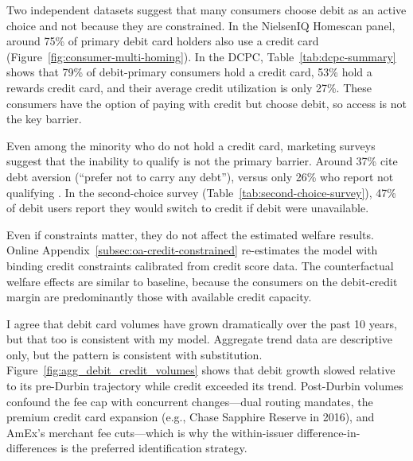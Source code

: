 \documentclass[main.tex]{subfiles}
\begin{document}
\begin{refsection}
Two independent datasets suggest that many consumers choose debit as an active choice and not because they are constrained.
In the NielsenIQ Homescan panel, around 75\% of primary debit card holders also use a credit card (Figure~\ref{fig:consumer-multi-homing}).
In the DCPC, Table~\ref{tab:dcpc-summary} shows that 79\% of debit-primary consumers hold a credit card, 53\% hold a rewards credit card, and their average credit utilization is only 27\%.
These consumers have the option of paying with credit but choose debit, so access is not the key barrier.

Even among the minority who do not hold a credit card, marketing surveys suggest that the inability to qualify is not the primary barrier.
Around 37\% cite debt aversion (``prefer not to carry any debt''), versus only 26\% who report not qualifying \parencite{Boehm2018}.
In the second-choice survey (Table~\ref{tab:second-choice-survey}), 47\% of debit users report they would switch to credit if debit were unavailable.

Even if constraints matter, they do not affect the estimated welfare results.
Online Appendix~\ref{subsec:oa-credit-constrained} re-estimates the model with binding credit constraints calibrated from credit score data. The counterfactual welfare effects are similar to baseline, because the consumers on the debit-credit margin are predominantly those with available credit capacity.

I agree that debit card volumes have grown dramatically over the past 10 years, but that too is consistent with my model.
Aggregate trend data are descriptive only, but the pattern is consistent with substitution.
Figure~\ref{fig:agg_debit_credit_volumes} shows that debit growth slowed relative to its pre-Durbin trajectory while credit exceeded its trend.
Post-Durbin volumes confound the fee cap with concurrent changes---dual routing mandates, the premium credit card expansion (e.g., Chase Sapphire Reserve in 2016), and AmEx's merchant fee cuts---which is why the within-issuer difference-in-differences is the preferred identification strategy.


\end{refsection}
\end{document}
